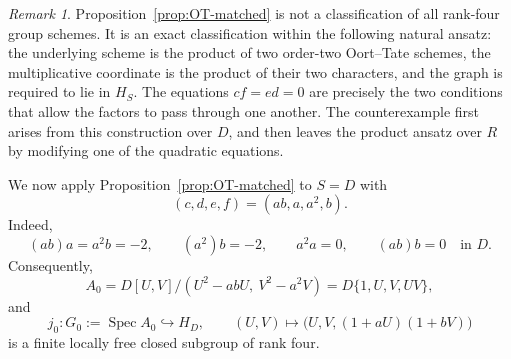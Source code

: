 \documentclass[11pt]{amsart}
\theoremstyle{remark}
\newtheorem{remark}[theorem]{Remark}
\newcommand{\Spec}{\operatorname{Spec}}
\begin{document}
\begin{remark}\label{rem:OT-scope}
Proposition~\ref{prop:OT-matched} is not a classification of all
rank-four group schemes.  It is an exact classification within the
following natural ansatz: the underlying scheme is the product of two
order-two Oort--Tate schemes, the multiplicative coordinate is the
product of their two characters, and the graph is required to lie in
\(H_S\).  The equations \(cf=ed=0\) are precisely the two conditions
that allow the factors to pass through one another.  The counterexample
first arises from this construction over \(D\), and then leaves the
product ansatz over \(R\) by modifying one of the quadratic equations.
\end{remark}

We now apply Proposition~\ref{prop:OT-matched} to \(S=D\) with
\begin{equation}\label{eq:our-OT-parameters}
 (c,d,e,f)=(ab,a,a^2,b).
\end{equation}
Indeed,
\[
 (ab)a=a^2b=-2,
 \qquad
 (a^2)b=-2,
 \qquad
 a^2a=0,
 \qquad
 (ab)b=0
 \quad\text{in }D.
\]
Consequently,
\begin{equation}\label{eq:A0}
 A_0
 =
 D[U,V]/(U^2-abU,\ V^2-a^2V)
 =
 D\{1,U,V,UV\},
\end{equation}
and
\begin{equation}\label{eq:matched-product}
 j_0:G_0:=\Spec A_0\hookrightarrow H_D,
 \qquad
 (U,V)\longmapsto
 \bigl(U,V,(1+aU)(1+bV)\bigr)
\end{equation}
is a finite locally free closed subgroup of rank four.
\end{document}

